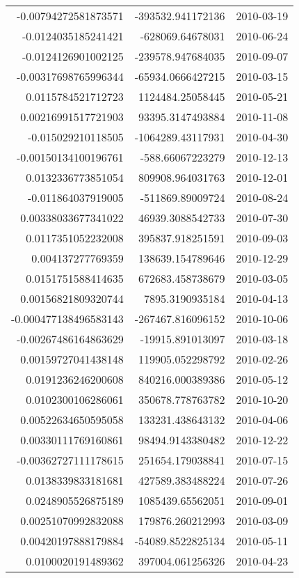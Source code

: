 \begin{tabular}{r | r | l}
-0.00794272581873571 & -393532.941172136 & 2010-03-19 \\
-0.0124035185241421 & -628069.64678031 & 2010-06-24 \\
-0.0124126901002125 & -239578.947684035 & 2010-09-07 \\
-0.00317698765996344 & -65934.0666427215 & 2010-03-15 \\
0.0115784521712723 & 1124484.25058445 & 2010-05-21 \\
0.00216991517721903 & 93395.3147493884 & 2010-11-08 \\
-0.015029210118505 & -1064289.43117931 & 2010-04-30 \\
-0.00150134100196761 & -588.66067223279 & 2010-12-13 \\
0.0132336773851054 & 809908.964031763 & 2010-12-01 \\
-0.011864037919005 & -511869.89009724 & 2010-08-24 \\
0.00338033677341022 & 46939.3088542733 & 2010-07-30 \\
0.0117351052232008 & 395837.918251591 & 2010-09-03 \\
0.004137277769359 & 138639.154789646 & 2010-12-29 \\
0.0151751588414635 & 672683.458738679 & 2010-03-05 \\
0.00156821809320744 & 7895.3190935184 & 2010-04-13 \\
-0.000477138496583143 & -267467.816096152 & 2010-10-06 \\
-0.00267486164863629 & -19915.891013097 & 2010-03-18 \\
0.00159727041438148 & 119905.052298792 & 2010-02-26 \\
0.0191236246200608 & 840216.000389386 & 2010-05-12 \\
0.0102300106286061 & 350678.778763782 & 2010-10-20 \\
0.00522634650595058 & 133231.438643132 & 2010-04-06 \\
0.00330111769160861 & 98494.9143380482 & 2010-12-22 \\
-0.00362727111178615 & 251654.179038841 & 2010-07-15 \\
0.0138339833181681 & 427589.383488224 & 2010-07-26 \\
0.0248905526875189 & 1085439.65562051 & 2010-09-01 \\
0.00251070992832088 & 179876.260212993 & 2010-03-09 \\
0.00420197888179884 & -54089.8522825134 & 2010-05-11 \\
0.0100020191489362 & 397004.061256326 & 2010-04-23 \\

\end{tabular}
